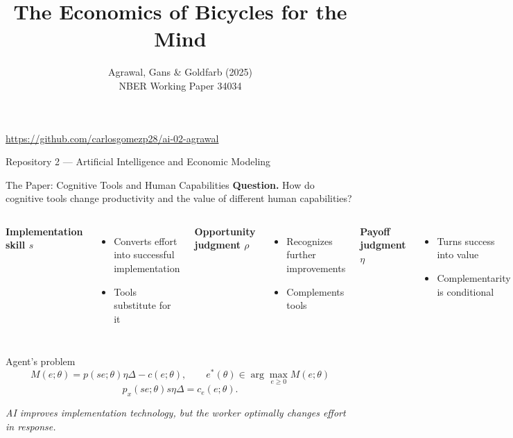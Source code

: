 \documentclass[aspectratio=169,11pt]{beamer}
\title{The Economics of Bicycles for the Mind}
\subtitle{Agrawal, Gans \& Goldfarb (2025)\\[0.4em]
NBER Working Paper 34034}
\author{}
\date{}
\begin{document}
\begin{frame}[plain]
  \titlepage
  \vspace{-1.1em}
  \begin{center}
    \small\url{https://github.com/carlosgomezp28/ai-02-agrawal}

    \vfill
    \footnotesize Repository 2 --- Artificial Intelligence and Economic Modeling
  \end{center}
\end{frame}

\begin{frame}{The Paper: Cognitive Tools and Human Capabilities}
  \textbf{Question.} How do cognitive tools change productivity and the value
  of different human capabilities?

  \smallskip
  \begin{columns}[T,onlytextwidth]
      \textbf{Implementation skill $s$}
      \begin{itemize}
        \item Converts effort into successful implementation
        \item Tools substitute for it
      \end{itemize}

      \textbf{Opportunity judgment $\rho$}
      \begin{itemize}
        \item Recognizes further improvements
        \item Complements tools
      \end{itemize}

      \textbf{Payoff judgment $\eta$}
      \begin{itemize}
        \item Turns success into value
        \item Complementarity is conditional
      \end{itemize}
  \end{columns}

  \vspace{-0.2em}
  \begin{block}{Agent's problem}
    \vspace{-0.8em}
    \[
      M(e;\theta)=p(se;\theta)\eta\Delta-c(e;\theta),\qquad
      e^*(\theta)\in\arg\max_{e\geq0}M(e;\theta)
    \]
    \vspace{-1.0em}
    \[
      p_x(se;\theta)s\eta\Delta=c_e(e;\theta).
    \]
  \end{block}
  \vspace{-0.3em}
  \centering\emph{AI improves implementation technology, but the worker
  optimally changes effort in response.}
\end{frame}
\end{document}
